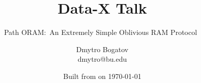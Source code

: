 

\ifnotes%
\fi

\title{Data-X Talk} %

\subtitle{Path ORAM:\ An Extremely Simple Oblivious RAM Protocol~\cite{DBLP:journals/corr/abs-1202-5150}}

\date{Built from \href{https://git.dbogatov.org/bu/PathORAM-Talk/commit/\version}{\emph{\version}} on \today}

\author{Dmytro Bogatov \\ dmytro@bu.edu}



\makeatletter
\def\beamer@framenotesbegin{%
	\usebeamercolor[fg]{normal text} 
		\gdef\beamer@noteitems{}%
		\gdef\beamer@notes{}%
}
\makeatother


\newcommand{\BigO}[1]{\mathcal{O}\left(#1\right)}
\newcommand{\RAM}{\textbf{RAM}}

\DeclarePairedDelimiter\ceil{\lceil}{\rceil}
\DeclarePairedDelimiter\floor{\lfloor}{\rfloor}
